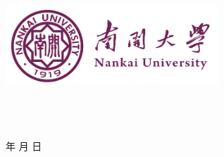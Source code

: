 \documentclass[12pt,a4paper]{article}
\begin{document}
\renewcommand{\contentsname}{目录}
\renewcommand{\appendixname}{附录}
\renewcommand{\appendixpagename}{附录}
\renewcommand{\refname}{参考文献} 
\renewcommand{\figurename}{图}
\renewcommand{\tablename}{表}
\renewcommand{\abstractname}{摘要}
\renewcommand{\today}{\number\year 年 \number\month 月 \number\day 日}

\renewcommand {\thefigure}{\thesection{}.\arabic{figure}}%
\renewcommand{\figurename}{图}
\renewcommand{\contentsname}{目录}  

\begin{titlepage}
    \begin{center}
    \includegraphics[width=0.6\textwidth]{NKU.png}\\[1cm]
    \vspace{20mm}
		\textbf{\huge\textbf{}}\\[0.5cm]
		\textbf{\huge{}}\\[2.3cm]

		\vspace{\fill}
    
    \centering
    \textsc{\LARGE {}}\\[0.5cm]
    
    \vfill
    {\Large \today}
    \end{center}
\end{titlepage}
\end{document}
